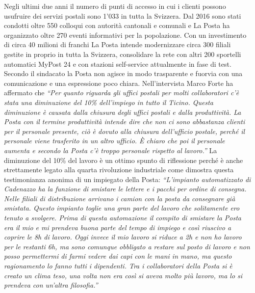 Negli ultimi due anni il numero di punti di accesso in cui i clienti possono usufruire dei servizi postali sono 1’033 in tutta la Svizzera. Dal 2016 sono stati condotti oltre 550 colloqui con autorità cantonali e comunali e La Posta ha organizzato oltre 270 eventi informativi per la popolazione. Con un investimento di circa 40 milioni di franchi La Posta intende modernizzare circa 300 filiali gestite in proprio in tutta la Svizzera, consolidare la rete con altri 200 sportelli automatici MyPost 24 e con stazioni self-service attualmente in fase di test.
Secondo il sindacato la Posta non agisce in modo trasparente e fuorvia con una comunicazione e una espressione poco chiara. Nell’intervista Marco Forte ha affermato che \textit{“Per quanto riguarda gli uffici postali per molti collaboratori c’è stata una diminuzione del 10\% dell’impiego in tutto il Ticino. Questa diminuzione è causata dalla chiusura degli uffici postali e dalla produttività. La Posta con il termine produttività intende dire che non ci sono abbastanza clienti per il personale presente, ciò è dovuto alla chiusura dell’ufficio postale, perché il personale viene trasferito in un altro ufficio. È chiaro che poi il personale aumenta e secondo la Posta c’è troppo personale rispetto al lavoro.”} La diminuzione del 10\% del lavoro è un ottimo spunto di riflessione perché è anche strettamente legato alla quarta rivoluzione industriale come dimostra questa testimonianza anonima di un impiegato della Posta:
\textit{“L’impianto automatizzato di Cadenazzo ha la funzione di smistare le lettere e i pacchi per ordine di consegna. Nelle filiali di distribuzione arrivano i camion con la posta da consegnare già smistata. Questo impianto toglie una gran parte del lavoro che solitamente ero tenuto a svolgere. Prima di questa automazione il compito di smistare la Posta era il mio e mi prendeva buona parte del tempo di impiego e così riuscivo a coprire le 8h di lavoro. Oggi invece il mio lavoro si riduce a 2h e non ho lavoro per le restanti 6h, ma sono comunque obbligato a restare sul posto di lavoro e non posso permettermi di farmi vedere dai capi con le mani in mano, ma questo ragionamento lo fanno tutti i dipendenti. Tra i collaboratori della Posta si è creato un clima teso, una volta non era così si aveva molto più lavoro, ma lo si prendeva con un’altra filosofia.”}
